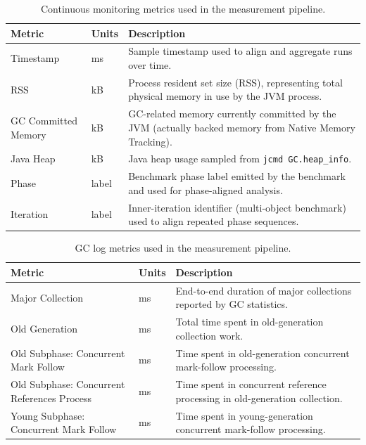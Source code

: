 \begin{table}[t]
\centering
\caption[Continuous monitoring metrics in the measurement pipeline]{Continuous monitoring metrics used in the measurement pipeline.}
\label{tab:memory-monitoring-metrics}
\begin{tabularx}{\textwidth}{@{}XlX@{}}
\toprule
\textbf{Metric} & \textbf{Units} & \textbf{Description} \\
\midrule
Timestamp & ms & Sample timestamp used to align and aggregate runs over time. \\
RSS & kB & Process resident set size (RSS), representing total physical memory in use by the JVM process. \\
GC Committed Memory & kB & GC-related memory currently committed by the JVM (actually backed memory from Native Memory Tracking). \\
Java Heap & kB & Java heap usage sampled from \texttt{jcmd GC.heap\_info}. \\
Phase & label & Benchmark phase label emitted by the benchmark and used for phase-aligned analysis. \\
Iteration & label & Inner-iteration identifier (multi-object benchmark) used to align repeated phase sequences. \\
\bottomrule
\end{tabularx}
\end{table}

\begin{table}[t]
\centering
\caption[GC log metrics in the measurement pipeline]{GC log metrics used in the measurement pipeline.}
\label{tab:gc-log-metrics}
\begin{tabularx}{\textwidth}{@{}XlX@{}}
\toprule
\textbf{Metric} & \textbf{Units} & \textbf{Description} \\
\midrule
Major Collection & ms & End-to-end duration of major collections reported by GC statistics. \\
Old Generation & ms & Total time spent in old-generation collection work. \\
Old Subphase: Concurrent Mark Follow & ms & Time spent in old-generation concurrent mark-follow processing. \\
Old Subphase: Concurrent References Process & ms & Time spent in concurrent reference processing in old-generation collection. \\
Young Subphase: Concurrent Mark Follow & ms & Time spent in young-generation concurrent mark-follow processing. \\
\bottomrule
\end{tabularx}
\end{table}